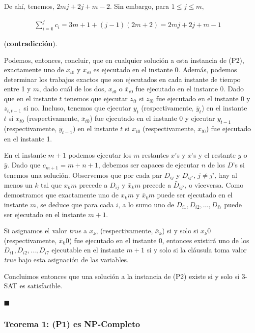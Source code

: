 \documentclass[14pt]{extarticle}
\begin{document}
De ahí, tenemos, $2mj + 2j + m - 2$. Sin embargo, para $1 \leq j \leq m$,

\begin{align*}
\sum_{i=0}^{j} c_i = 3m + 1 + (j - 1)(2m + 2) = 2mj + 2j + m - 1
\end{align*}

(\textbf{contradicción}).

Podemos, entonces, concluir, que en cualquier solución a esta instancia de (P2), exactamente uno de $x_{i0}$ y $\bar x_{i0}$ es ejecutado en el instante 0. Además, podemos determinar los trabajos exactos que son ejecutados en cada instante de tiempo entre 1 y $m$, dado cuál de los dos, $x_{i0}$ o $\bar x_{i0}$ fue ejecutado en el instante 0. Dado que en el instante $t$ tenemos que ejecutar $z_{it}$ si $z_{i0}$ fue ejecutado en el instante 0 y $z_{i, t-1}$ si no. Incluso, tenemos que ejecutar $y_t$ (respectivamente, $\bar y_t$) en el instante $t$ si $x_{t0}$ (respectivamente, $\bar x_{t0}$) fue ejecutado en el instante 0 y ejecutar $y_{t - 1}$ (respectivamente, $\bar y_{t - 1}$) en el instante $t$ si $x_{t0}$ (respectivamente, $\bar x_{t0}$) fue ejecutado en el instante 1.

En el instante $m + 1$ podemos ejecutar los $m$ restantes $x$'s y $\bar x$'s y el restante $y$ o $\bar y$. Dado que $c_{m+1} = m + n + 1$, debemos ser capaces de ejecutar $n$ de los $D$'s si tenemos una solución. Observemos que por cada par $D_{ij}$ y  $D_{ij'}$, $j \neq j'$, hay al menos un $k$ tal que $x_km$ precede a $D_{ij}$ y $\bar x_km$ precede a $\bar D_{ij'}$, o viceversa. Como demostramos que exactamente uno de $x_km$ y $\bar x_km$ puede ser ejecutado en el instante $m$, se deduce que para cada $i$, a lo sumo uno de $D_{i1}, D_{i2}, \ldots, D_{i7}$ puede ser ejecutado en el instante $m + 1$.

Si asignamos el valor \textit{true} a $x_k$, (respectivamente, $\bar x_k$) si y solo si $x_k0$ (respectivamente, $\bar x_k0$) fue ejecutado en el instante 0, entonces existirá uno de los $D_{i1}, D_{i2}, \ldots, D_{i7}$ ejecutable en el instante $m + 1$ si y solo si la cláusula toma valor \textit{true} bajo esta asignación de las variables.

Concluimos entonces que una solución a la instancia de (P2) existe si y solo si 3-SAT es satisfacible.

$\blacksquare$

\subsubsection*{Teorema 1: (P1) es NP-Completo}
\end{document}
